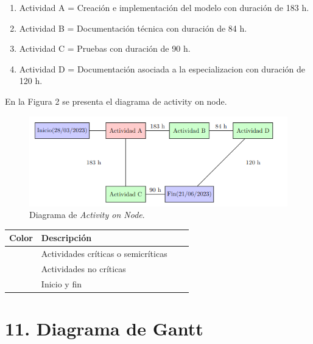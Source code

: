 \documentclass[
11pt, %
codirector, %
]{charter}
\begin{document}
\begin{enumerate}
	
	\item Actividad A = Creación e implementación del modelo con duración de 183 h.
	\item Actividad B = Documentación técnica con duración de 84 h.
	\item Actividad C = Pruebas con duración de 90 h.
	\item Actividad D = Documentación asociada a la especializacion con duración de 120 h.
	
	
	\end{enumerate}
	En la Figura 2 se presenta el diagrama de activity on node.
\begin{figure}[htpb]
\centering 
\includegraphics[width=.8\textwidth]{./Figuras/AoN.png}
\caption{Diagrama de \textit{Activity on Node}.}
\label{fig:AoN}
\end{figure}


\begin{table}[ht]
\begin{tabularx}{\linewidth}{@{}|l|X|X|l|@{}}
\hline
\rowcolor[HTML]{C0C0C0} 
Color           & Descripción\\ \hline
\cellcolor{red!20}      & Actividades críticas o semicríticas    \\ \hline
\cellcolor{green!20}  & Actividades no críticas	\\ \hline
\cellcolor{blue!20}   &  Inicio y fin	   \\ \hline
\end{tabularx}
\end{table}







\section{11. Diagrama de Gantt}
\label{sec:gantt}
\end{document}
